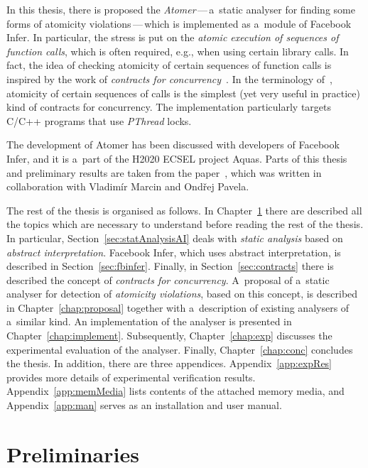In this thesis, there is proposed the \emph{Atomer}\,---\,a~static
analyser for finding some forms of atomicity violations\,---\,which is
implemented as a~module of Facebook Infer. In particular, the stress 
is put on the \emph{atomic execution of sequences of function calls}, which is
often required, e.g., when using certain library calls. In fact, the idea
of checking atomicity of certain sequences of function calls is inspired
by the work of \emph{contracts for concurrency}~\cite{contracts2017}. In
the terminology of~\cite{contracts2017}, atomicity of certain sequences
of calls is the simplest (yet very useful in practice) kind of contracts 
for concurrency. The implementation particularly targets C/C++ programs 
that use \emph{PThread} locks.

The development of Atomer has been discussed with developers of
Facebook Infer, and it is a~part of the H2020 ECSEL project Aquas. Parts
of this thesis and preliminary results are taken from the
paper~\cite{excel2019FBInfer}, which was written in collaboration with 
Vladimír Marcin and Ondřej Pavela.

The rest of the thesis is organised as follows. In
Chapter~\ref{chap:prelim} there are described all the topics
which are necessary to understand before reading the rest of the thesis. In
particular, Section~\ref{sec:statAnalysisAI} deals with
\emph{static analysis} based on \emph{abstract interpretation}.
Facebook Infer, which uses abstract interpretation, is described in
Section~\ref{sec:fbinfer}. Finally, in Section~\ref{sec:contracts} there is
described the concept of \emph{contracts for concurrency}. A~proposal of
a~static analyser for detection of \emph{atomicity violations}, based on this
concept, is described in Chapter~\ref{chap:proposal} together with
a~description of existing analysers of a~similar kind. An implementation
of the analyser is presented in Chapter~\ref{chap:implement}. Subsequently,
Chapter~\ref{chap:exp} discusses the experimental evaluation of the analyser.
Finally, Chapter~\ref{chap:conc} concludes the thesis. In addition, there are
three appendices. Appendix~\ref{app:expRes} provides more details of 
experimental verification results. Appendix~\ref{app:memMedia} lists contents 
of the attached memory media, and Appendix~\ref{app:man} serves as an 
installation and user manual.



\chapter{Preliminaries}
\label{chap:prelim}


